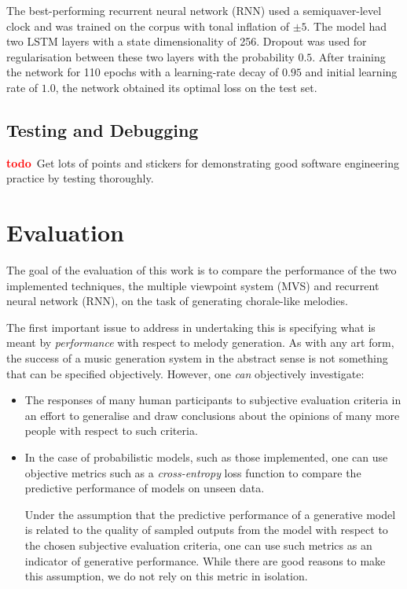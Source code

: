 \documentclass[12pt,a4paper,twoside,openright]{report}
\newcommand{\todo}{\textcolor{red}{\textbf{todo}~}}
\begin{document}
The best-performing recurrent neural network (RNN) used a semiquaver-level clock
and was trained on the corpus with tonal inflation of $\pm 5$. The model had two
LSTM layers with a state dimensionality of 256. Dropout was used for
regularisation between these two layers with the probability $0.5$.  After
training the network for 110 epochs with a learning-rate decay of $0.95$ and
initial learning rate of $1.0$, the network obtained its optimal loss on the
test set.

\section{Testing and Debugging}

\todo Get lots of points and stickers for demonstrating good software
engineering practice by testing thoroughly.

\chapter{Evaluation}\label{chap:eval}

The goal of the evaluation of this work is to compare the performance of the two
implemented techniques, the multiple viewpoint system (MVS) and recurrent neural
network (RNN), on the task of generating chorale-like melodies.

The first important issue to address in undertaking this is specifying what is
meant by \emph{performance} with respect to melody generation. As with any art
form, the success of a music generation system in the abstract sense is not
something that can be specified objectively. However, one \emph{can} objectively
investigate:
\begin{itemize}
  \item The responses of many human participants to subjective evaluation
    criteria in an effort to generalise and draw conclusions about the opinions
    of many more people with respect to such criteria.  
  \item In the case of probabilistic models, such as those implemented, one can
    use objective metrics such as a \emph{cross-entropy} loss function to
    compare the predictive performance of models on unseen data. 

    Under the assumption that the predictive performance of a generative model
    is related to the quality of sampled outputs from the model with respect to
    the chosen subjective evaluation criteria, one can use such metrics as an
    indicator of generative performance. While there are good reasons to make
    this assumption, we do not rely on this metric in isolation.
\end{itemize}
\end{document}
